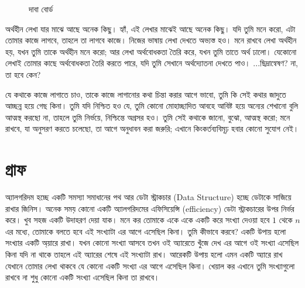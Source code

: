 		\begin{figure}[ht!]
			\centering
{}
			\caption{দাবা বোর্ড}
			\label{fig:chess}
		\end{figure}
		
অর্থহীন লেখা যার মাঝে আছে অনেক কিছু। হ্যাঁ, এই লেখার মাঝেই আছে অনেক কিছু। যদি তুমি মনে করো, এটা তোমার কাজে লাগবে, তাহলে তা লাগবে কাজে। নিজের ভাষায় লেখা দেখতে অভ্যস্ত হও। মনে রাখবে লেখা অর্থহীন হয়, যখন তুমি তাকে অর্থহীন মনে করো; আর লেখা অর্থবোধকতা তৈরি করে, যখন তুমি তাতে অর্থ ঢালো। যেকোনো লেখাই তোমার কাছে অর্থবোধকতা তৈরি করতে পারে, যদি তুমি সেখানে অর্থদ্যোতনা দেখতে পাও। ...ছিদ্রান্বেষণ? না, তা হবে কেন?

যে কথাকে কাজে লাগাতে চাও, তাকে কাজে লাগানোর কথা চিন্তা করার আগে ভাবো, তুমি কি সেই কথার জাদুতে আচ্ছন্ন হয়ে গেছ কিনা। তুমি যদি নিশ্চিত হও যে, তুমি কোনো মোহাচ্ছাদিত আবহে আবিষ্ট হয়ে অন্যের শেখানো বুলি আত্মস্থ করছো না, তাহলে তুমি নির্ভয়ে, নিশ্চিন্তে অগ্রসর হও। তুমি সেই কথাকে জানো, বুঝো, আত্মস্থ করো; মনে রাখবে, যা অনুসরণ করতে চলেছো, তা আগে অনুধাবন করা জরুরি; এখানে কিংকর্তব্যবিমূঢ় হবার কোনো সুযোগ নেই।


\section{গ্রাফ}
অ্যালগরিদম হচ্ছে একটি সমস্যা সমাধানের পথ আর ডেটা স্ট্রাকচার (Data Structure) হচ্ছে ডেটাকে সাজিয়ে রাখার জিনিস। অনেক সময় কোনো একটি অ্যালগরিদমের এফিসিয়েন্সি (efficiency) ডেটা স্ট্রাকচারের উপর নির্ভর করে। খুব সহজ একটি উদাহরণ দেয়া যাক। মনে কর তোমাকে একে একে একটি করে সংখ্যা দেওয়া হবে $1$ থেকে $n$ এর মধ্যে, তোমাকে বলতে হবে এই সংখ্যাটা এর আগে এসেছিল কিনা। তুমি কীভাবে করবে? একটি উপায় হলো সংখ্যার একটি অ্য়ারে রাখা। যখন কোনো সংখ্যা আসবে তখন ওই অ্যারেতে খুঁজে দেখ এর আগে ওই সংখ্যা এসেছিল কিনা যদি না থাকে তাহলে এই অ্যারের শেষে এই সংখ্যাটা রাখ। আরেকটি উপায় হলো এমন একটি অ্যারে রাখ যেখানে তোমার লেখা থাকবে যে কোনো একটি সংখ্যা এর আগে এসেছিল কিনা। খেয়াল কর এখানে তুমি সংখ্যাগুলো রাখবে না শুধু কোনো একটি সংখ্যা এসেছিল কিনা তা রাখবে।

